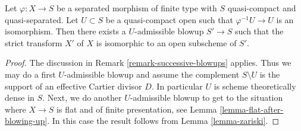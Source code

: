 \begin{lemma}
\label{lemma-zariski-after-blowup}
Let $\varphi : X \to S$ be a separated morphism of finite type with
$S$ quasi-compact and quasi-separated. Let $U \subset S$ be a
quasi-compact open such that $\varphi^{-1}U \to U$ is an isomorphism.
Then there exists a $U$-admissible blowup $S' \to S$ such that
the strict transform $X'$ of $X$ is isomorphic to an open subscheme
of $S'$.
\end{lemma}

\begin{proof}
The discussion in Remark \ref{remark-successive-blowups} applies.
Thus we may do a first $U$-admissible blowup and assume the complement
$S \setminus U$ is the support of an effective Cartier divisor $D$.
In particular $U$ is scheme theoretically dense in $S$.
Next, we do another $U$-admissible blowup to get to the situation where
$X \to S$ is flat and of finite presentation, see
Lemma \ref{lemma-flat-after-blowing-up}.
In this case the result follows from Lemma \ref{lemma-zariski}.
\end{proof}
